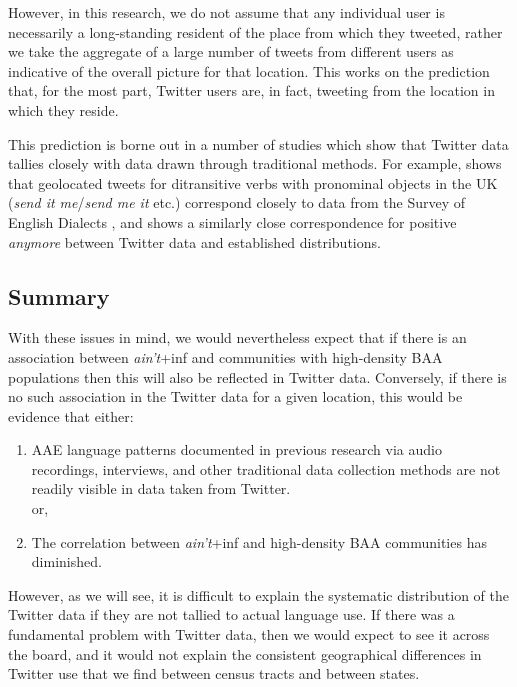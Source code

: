 \documentclass[output=paper,colorlinks,citecolor=brown,draftmode]{langscibook}
\begin{document}
However, in this research, we do not assume that any individual user is necessarily a long-standing resident of the place from which they tweeted, rather we take the aggregate of a large number of tweets from different users as indicative of the overall picture for that location. This works on the prediction that, for the most part, Twitter users are, in fact, tweeting from the location in which they reside.

This prediction is borne out in a number of studies which show that Twitter data tallies closely with data drawn through traditional methods. For example, \citet{stevenson2016} shows that geolocated tweets for ditransitive verbs with pronominal objects in the UK (\textit{send it me}/\textit{send me it} etc.) correspond closely to data from the Survey of English Dialects \citep{orton1962}, and \citet{strelluf2019} shows a similarly close correspondence for positive \textit{anymore} between Twitter data and established distributions.

\subsection{Summary}
With these issues in mind, we would nevertheless expect that if there is an association between \textit{ain't}+inf and communities with high-density BAA populations \citep{fisher2022,labov1968a,kautzsch2012,weldon1994} then this will also be reflected in Twitter data. Conversely, if there is no such association in the Twitter data for a given location, this would be evidence that either:

\begin{enumerate}[label=\Roman*.]
	\item AAE language patterns documented in previous research via audio recordings, interviews, and other traditional data collection methods are not readily visible in data taken from Twitter.
\vspace{0.5em}
\\ or,
\vspace{0.5em}
	\item The correlation between \textit{ain’t}+inf and high-density BAA communities has diminished.
\end{enumerate}


However, as we will see, it is difficult to explain the systematic distribution of the Twitter data if they are not tallied to actual language use. If there was a fundamental problem with Twitter data, then we would expect to see it across the board, and it would not explain the consistent geographical differences in Twitter use that we find between census tracts and between states.
\end{document}
